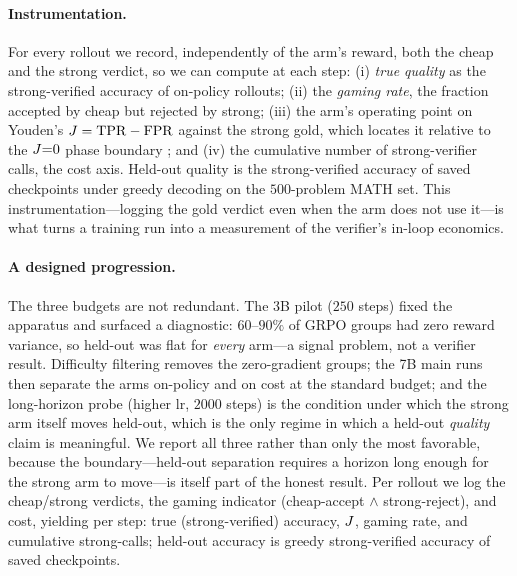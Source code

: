 \paragraph{Instrumentation.} For every rollout we record, independently of the arm's reward, both the cheap
and the strong verdict, so we can compute at each step: (i) \emph{true quality} as the strong-verified
accuracy of on-policy rollouts; (ii) the \emph{gaming rate}, the fraction accepted by cheap but rejected by
strong; (iii) the arm's operating point on Youden's $J=\mathrm{TPR}-\mathrm{FPR}$ against the strong gold,
which locates it relative to the $J{=}0$ phase boundary \citep{rateorfate2026}; and (iv) the cumulative
number of strong-verifier calls, the cost axis. Held-out quality is the strong-verified accuracy of saved
checkpoints under greedy decoding on the $500$-problem MATH set. This instrumentation---logging the gold
verdict even when the arm does not use it---is what turns a training run into a measurement of the verifier's
in-loop economics.

\paragraph{A designed progression.} The three budgets are not redundant. The 3B pilot ($250$ steps) fixed the
apparatus and surfaced a diagnostic: $60$--$90\%$ of GRPO groups had zero reward variance, so held-out was
flat for \emph{every} arm---a signal problem, not a verifier result. Difficulty filtering removes the
zero-gradient groups; the 7B main runs then separate the arms on-policy and on cost at the standard budget;
and the long-horizon probe (higher lr, $2000$ steps) is the condition under which the strong arm itself moves
held-out, which is the only regime in which a held-out \emph{quality} claim is meaningful. We report all
three rather than only the most favorable, because the boundary---held-out separation requires a horizon long
enough for the strong arm to move---is itself part of the honest result. Per rollout we log the cheap/strong verdicts, the gaming
indicator (cheap-accept $\wedge$ strong-reject), and cost, yielding per step: true (strong-verified) accuracy,
$J$, gaming rate, and cumulative strong-calls; held-out accuracy is greedy strong-verified accuracy of saved
checkpoints.

